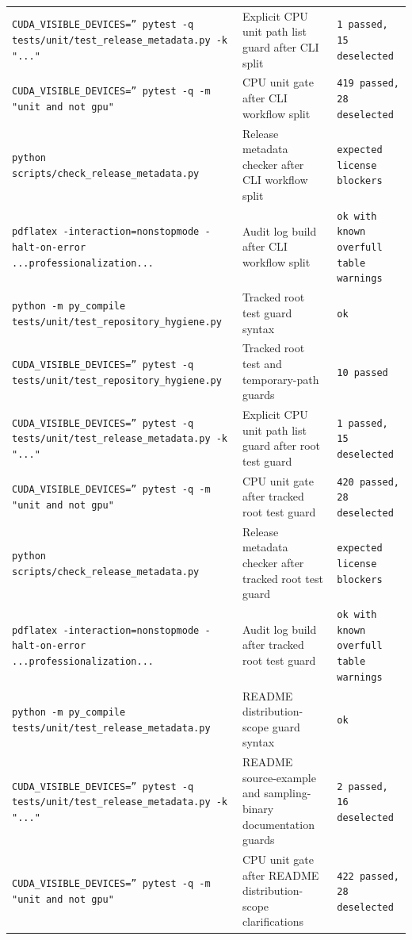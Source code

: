 \documentclass[11pt]{article}
\begin{document}
\begin{center}
\begin{tabular}{lll}
\texttt{CUDA\_VISIBLE\_DEVICES='' pytest -q tests/unit/test\_release\_metadata.py -k "..."} &
Explicit CPU unit path list guard after CLI split &
\texttt{1 passed, 15 deselected} \\
\texttt{CUDA\_VISIBLE\_DEVICES='' pytest -q -m "unit and not gpu"} &
CPU unit gate after CLI workflow split &
\texttt{419 passed, 28 deselected} \\
\texttt{python scripts/check\_release\_metadata.py} &
Release metadata checker after CLI workflow split &
\texttt{expected license blockers} \\
\texttt{pdflatex -interaction=nonstopmode -halt-on-error ...professionalization...} &
Audit log build after CLI workflow split &
\texttt{ok with known overfull table warnings} \\
\texttt{python -m py\_compile tests/unit/test\_repository\_hygiene.py} &
Tracked root test guard syntax &
\texttt{ok} \\
\texttt{CUDA\_VISIBLE\_DEVICES='' pytest -q tests/unit/test\_repository\_hygiene.py} &
Tracked root test and temporary-path guards &
\texttt{10 passed} \\
\texttt{CUDA\_VISIBLE\_DEVICES='' pytest -q tests/unit/test\_release\_metadata.py -k "..."} &
Explicit CPU unit path list guard after root test guard &
\texttt{1 passed, 15 deselected} \\
\texttt{CUDA\_VISIBLE\_DEVICES='' pytest -q -m "unit and not gpu"} &
CPU unit gate after tracked root test guard &
\texttt{420 passed, 28 deselected} \\
\texttt{python scripts/check\_release\_metadata.py} &
Release metadata checker after tracked root test guard &
\texttt{expected license blockers} \\
\texttt{pdflatex -interaction=nonstopmode -halt-on-error ...professionalization...} &
Audit log build after tracked root test guard &
\texttt{ok with known overfull table warnings} \\
\texttt{python -m py\_compile tests/unit/test\_release\_metadata.py} &
README distribution-scope guard syntax &
\texttt{ok} \\
\texttt{CUDA\_VISIBLE\_DEVICES='' pytest -q tests/unit/test\_release\_metadata.py -k "..."} &
README source-example and sampling-binary documentation guards &
\texttt{2 passed, 16 deselected} \\
\texttt{CUDA\_VISIBLE\_DEVICES='' pytest -q -m "unit and not gpu"} &
CPU unit gate after README distribution-scope clarifications &
\texttt{422 passed, 28 deselected} \\

\end{tabular}
\end{center}
\end{document}
